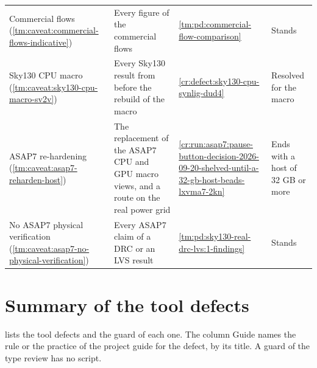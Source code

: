 \begin{table}[ht]
\begin{tabular}{@{}>{\raggedright\arraybackslash}p{32mm}>{\raggedright\arraybackslash}p{44mm}>{\raggedright\arraybackslash}p{34mm}>{\raggedright\arraybackslash}p{32mm}@{}}
    Commercial flows (\cref{tm:caveat:commercial-flows-indicative}) & Every figure of the commercial flows & \cref{tm:pd:commercial-flow-comparison} & Stands\\
    Sky130 CPU macro (\cref{tm:caveat:sky130-cpu-macro-sv2v}) & Every Sky130 result from before the rebuild of the macro & \cref{cr:defect:sky130-cpu-synlig-dud4} & Resolved for the macro\\
    ASAP7 re-hardening (\cref{tm:caveat:asap7-reharden-host}) & The replacement of the ASAP7 CPU and GPU macro views, and a route on the real power grid & \cref{cr:run:asap7:pause-button-decision-2026-09-20-shelved-until-a-32-gb-host-beads-lxvma7-2kn} & Ends with a host of 32 GB or more\\
    No ASAP7 physical verification (\cref{tm:caveat:asap7-no-physical-verification}) & Every ASAP7 claim of a DRC or an LVS result & \cref{tm:pd:sky130-real-drc-lvs:1-findings} & Stands\\
    \bottomrule
  \end{tabular}
\end{table}

\section{Summary of the tool defects}\label{tm:ch:tool-defects-and-caveats:defect-summary}
 lists the tool defects and the guard of each one. The column Guide names the rule or the practice of the project guide for the defect, by its title. A guard of the type review has no script.

